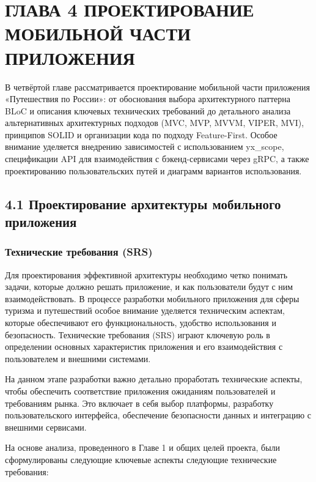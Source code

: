 \section{ГЛАВА 4 ПРОЕКТИРОВАНИЕ МОБИЛЬНОЙ ЧАСТИ ПРИЛОЖЕНИЯ}

В четвёртой главе рассматривается проектирование мобильной части приложения «Путешествия по России»: от обоснования выбора архитектурного паттерна BLoC и описания ключевых технических требований до детального анализа альтернативных архитектурных подходов (MVC, MVP, MVVM, VIPER, MVI), принципов SOLID и организации кода по подходу Feature-First. Особое внимание уделяется внедрению зависимостей с использованием yx\_scope, спецификации API для взаимодействия с бэкенд-сервисами через gRPC, а также проектированию пользовательских путей и диаграмм вариантов использования.

\subsection*{4.1 Проектирование архитектуры мобильного приложения}


\subsubsection*{Технические требования (SRS)}


Для проектирования эффективной архитектуры необходимо четко понимать задачи, которые должно решать приложение, и как пользователи будут с ним взаимодействовать. В процессе разработки мобильного приложения для сферы туризма и путешествий особое внимание уделяется техническим аспектам, которые обеспечивают его функциональность, удобство использования и безопасность. Технические требования (SRS) играют ключевую роль в определении основных характеристик приложения и его взаимодействия с пользователем и внешними системами.

На данном этапе разработки важно детально проработать технические аспекты, чтобы обеспечить соответствие приложения ожиданиям пользователей и требованиям рынка. Это включает в себя выбор платформы, разработку пользовательского интерфейса, обеспечение безопасности данных и интеграцию с внешними сервисами.

На основе анализа, проведенного в Главе 1 и общих целей проекта, были сформулированы следующие ключевые аспекты следующие технические требования:


